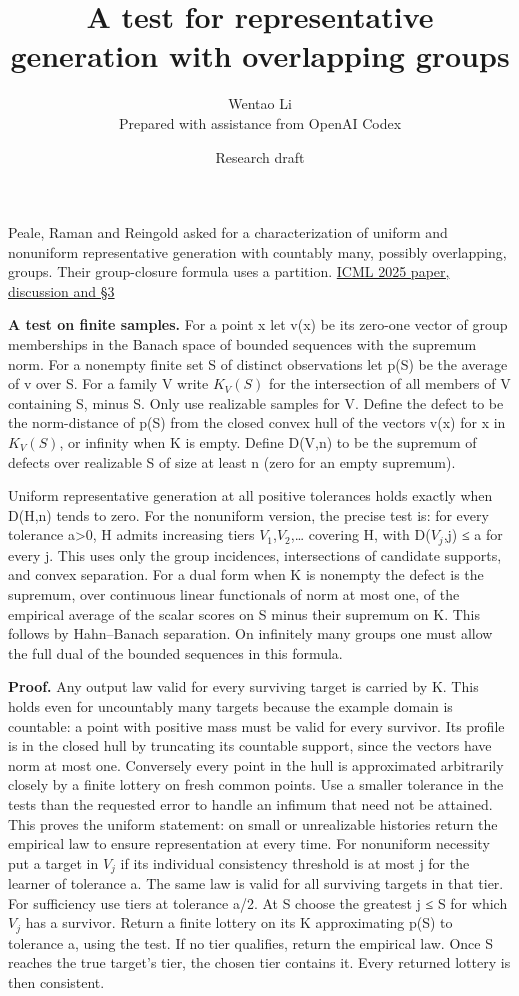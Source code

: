 \documentclass[11pt]{article}
\title{A test for representative generation with overlapping groups}
\author{Wentao Li\\{\small Prepared with assistance from OpenAI Codex}}
\date{Research draft}
\begin{document}
\maketitle
Peale, Raman and Reingold asked for a characterization of uniform and nonuniform representative generation with countably many, possibly overlapping, groups. Their group-closure formula uses a partition. \href{https://proceedings.mlr.press/v267/peale25a.html}{ICML 2025 paper, discussion and §3}

\textbf{A test on finite samples.} For a point x let v(x) be its zero-one vector of group memberships in the Banach space of bounded sequences with the supremum norm. For a nonempty finite set S of distinct observations let p(S) be the average of v over S. For a family V write \(K_V(S)\) for the intersection of all members of V containing S, minus S. Only use realizable samples for V. Define the defect to be the norm-distance of p(S) from the closed convex hull of the vectors v(x) for x in \(K_V(S)\), or infinity when K is empty. Define D(V,n) to be the supremum of defects over realizable S of size at least n (zero for an empty supremum).

Uniform representative generation at all positive tolerances holds exactly when D(H,n) tends to zero. For the nonuniform version, the precise test is: for every tolerance a\textgreater0, H admits increasing tiers \(V_{1}\),\(V_{2}\),\ldots{} covering H, with D(\(V_{j}\),j) ≤ a for every j. This uses only the group incidences, intersections of candidate supports, and convex separation. For a dual form when K is nonempty the defect is the supremum, over continuous linear functionals of norm at most one, of the empirical average of the scalar scores on S minus their supremum on K. This follows by Hahn--Banach separation. On infinitely many groups one must allow the full dual of the bounded sequences in this formula.

\textbf{Proof.} Any output law valid for every surviving target is carried by K. This holds even for uncountably many targets because the example domain is countable: a point with positive mass must be valid for every survivor. Its profile is in the closed hull by truncating its countable support, since the vectors have norm at most one. Conversely every point in the hull is approximated arbitrarily closely by a finite lottery on fresh common points. Use a smaller tolerance in the tests than the requested error to handle an infimum that need not be attained. This proves the uniform statement: on small or unrealizable histories return the empirical law to ensure representation at every time. For nonuniform necessity put a target in \(V_{j}\) if its individual consistency threshold is at most j for the learner of tolerance a. The same law is valid for all surviving targets in that tier. For sufficiency use tiers at tolerance a/2. At S choose the greatest j ≤ \textbar S\textbar{} for which \(V_{j}\) has a survivor. Return a finite lottery on its K approximating p(S) to tolerance a, using the test. If no tier qualifies, return the empirical law. Once \textbar S\textbar{} reaches the true target's tier, the chosen tier contains it. Every returned lottery is then consistent.
\end{document}
